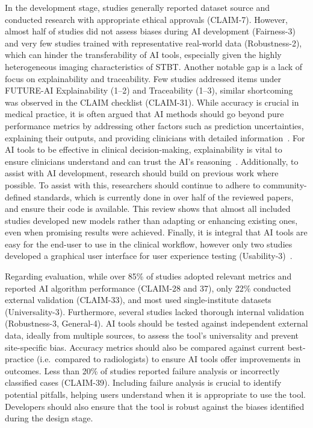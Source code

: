 In the development stage, studies generally reported dataset source and conducted research with appropriate ethical approvals (CLAIM-7).
However, almost half of studies did not assess biases during AI development (Fairness-3) and very few studies trained with representative real-world data (Robustness-2), which can hinder the transferability of AI tools, especially given the highly heterogeneous imaging characteristics of STBT.
Another notable gap is a lack of focus on explainability and traceability.
Few studies addressed items under FUTURE-AI Explainability (1--2) and Traceability (1--3), similar shortcoming was observed in the CLAIM checklist (CLAIM-31).
While accuracy is crucial in medical practice, it is often argued that AI methods should go beyond pure performance metrics by addressing other factors such as prediction uncertainties, explaining their outputs, and providing clinicians with detailed information~\autocite{abrantes2024}.
For AI tools to be effective in clinical decision-making, explainability is vital to ensure clinicians understand and can trust the AI's reasoning~\autocite{amann2020}.
Additionally, to assist with AI development, research should build on previous work where possible.
To assist with this, researchers should continue to adhere to community-defined standards, which is currently done in over half of the reviewed papers, and ensure their code is available.
This review shows that almost all included studies developed new models rather than adapting or enhancing existing ones, even when promising results were achieved.
Finally, it is integral that AI tools are easy for the end-user to use in the clinical workflow, however only two studies developed a graphical user interface for user experience testing (Usability-3)~\autocite{dong2024,yang2022}.

Regarding evaluation, while over 85\% of studies adopted relevant metrics and reported AI algorithm performance (CLAIM-28 and 37), only 22\% conducted external validation (CLAIM-33), and most used single-institute datasets (Universality-3).
Furthermore, several studies lacked thorough internal validation (Robustness-3, General-4).
AI tools should be tested against independent external data, ideally from multiple sources, to assess the tool's universality and prevent site-specific bias.
Accuracy metrics should also be compared against current best-practice (i.e.\ compared to radiologists) to ensure AI tools offer improvements in outcomes.
Less than 20\% of studies reported failure analysis or incorrectly classified cases (CLAIM-39).
Including failure analysis is crucial to identify potential pitfalls, helping users understand when it is appropriate to use the tool.
Developers should also ensure that the tool is robust against the biases identified during the design stage.

